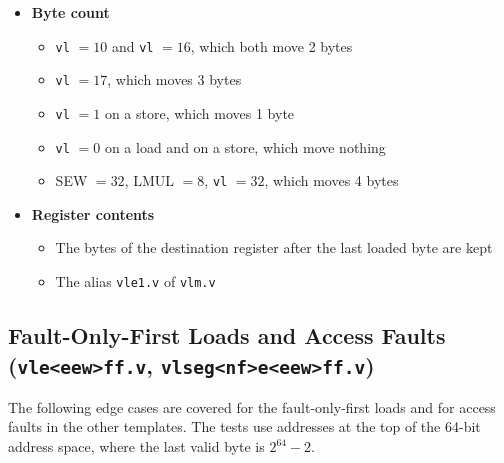 \documentclass[11pt,a4paper]{article}
\begin{document}
\begin{itemize}
    \item \textbf{Byte count}
    \begin{itemize}
        \item \texttt{vl} $= 10$ and \texttt{vl} $= 16$, which both move 2 bytes
        \item \texttt{vl} $= 17$, which moves 3 bytes
        \item \texttt{vl} $= 1$ on a store, which moves 1 byte
        \item \texttt{vl} $= 0$ on a load and on a store, which move nothing
        \item SEW $= 32$, LMUL $= 8$, \texttt{vl} $= 32$, which moves 4 bytes
    \end{itemize}

    \item \textbf{Register contents}
    \begin{itemize}
        \item The bytes of the destination register after the last loaded byte are kept
        \item The alias \texttt{vle1.v} of \texttt{vlm.v}
    \end{itemize}
\end{itemize}

\subsection*{Fault-Only-First Loads and Access Faults (\texttt{vle<eew>ff.v},
\texttt{vlseg<nf>e<eew>ff.v})}
\label{subsec:ldst-fof}

The following edge cases are covered for the fault-only-first loads and for access faults in
the other templates. The tests use addresses at the top of the 64-bit address space, where the
last valid byte is $2^{64} - 2$.
\end{document}
